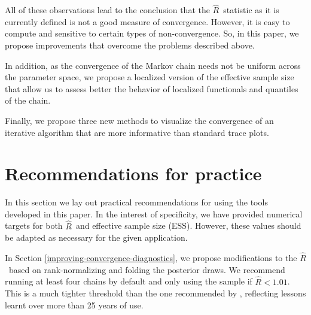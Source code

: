\documentclass[american,]{article}
\newcommand{\Rhat}{$\widehat{R}$}
\newcommand{\sRhat}{split-$\widehat{R}$}
\theoremstyle{definition}
\begin{document}
All of these observations lead to the conclusion that the \Rhat\ statistic 
as it is currently defined is not a good measure of convergence. However, it is 
easy to compute and sensitive to certain types of non-convergence. So, 
in this paper, we propose improvements that overcome the  
problems described above.

In addition, as the convergence
of the Markov chain needs not be uniform across the parameter space, we
propose a localized version of the effective sample size
that allow us to assess better the behavior of localized 
functionals and quantiles of the chain.

Finally, we propose three new methods to visualize the 
convergence of an iterative algorithm that are more informative than standard 
trace plots.


\section{Recommendations for practice}
In this section we lay out practical recommendations for using the tools 
developed in this paper. In the interest of specificity, we have 
provided numerical targets for both \Rhat\ and effective sample size (ESS). 
However, these values should be adapted as necessary for the given application.

In Section \ref{improving-convergence-diagnostics}, we propose modifications to the 
\Rhat\ based on rank-normalizing and folding the posterior draws.  We recommend running at least 
four chains by default and only using the sample if  $\widehat{R} < 1.01$. 
This is a much tighter threshold than the one recommended by 
\citet{Gelman+Rubin:1992}, reflecting lessons learnt over more than 25 years of use.
 
\end{document}
